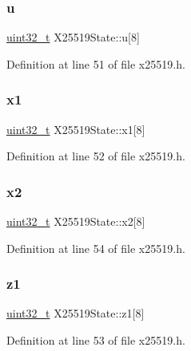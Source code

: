 \subsubsection{\texorpdfstring{u}{u}}
{\footnotesize\ttfamily \hyperlink{stdint_8h_a435d1572bf3f880d55459d9805097f62}{uint32\+\_\+t} X25519\+State\+::u\mbox{[}8\mbox{]}}



Definition at line 51 of file x25519.\+h.

\mbox{\label{structX25519State_a6bb06918a64225ffdceddc7526b5f803}} 
\subsubsection{\texorpdfstring{x1}{x1}}
{\footnotesize\ttfamily \hyperlink{stdint_8h_a435d1572bf3f880d55459d9805097f62}{uint32\+\_\+t} X25519\+State\+::x1\mbox{[}8\mbox{]}}



Definition at line 52 of file x25519.\+h.

\mbox{\label{structX25519State_a5547627f368f078962c6d5fdfcccbad4}} 
\subsubsection{\texorpdfstring{x2}{x2}}
{\footnotesize\ttfamily \hyperlink{stdint_8h_a435d1572bf3f880d55459d9805097f62}{uint32\+\_\+t} X25519\+State\+::x2\mbox{[}8\mbox{]}}



Definition at line 54 of file x25519.\+h.

\mbox{\label{structX25519State_ad87e44ce7d024bb758bf2f25cd889d17}} 
\subsubsection{\texorpdfstring{z1}{z1}}
{\footnotesize\ttfamily \hyperlink{stdint_8h_a435d1572bf3f880d55459d9805097f62}{uint32\+\_\+t} X25519\+State\+::z1\mbox{[}8\mbox{]}}



Definition at line 53 of file x25519.\+h.

